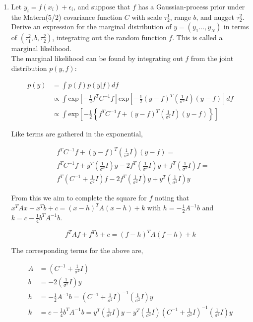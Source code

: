 \documentclass[10pt]{article}
\begin{document}
\begin{enumerate}[label=(\Alph*)]
            \clearpage

            \item Let $y_i = f(x_i) + \epsilon_i$, and suppose that $f$ has a Gaussian-process prior under the Matern(5/2) covariance function $C$ with scale $\tau^1_2$, range $b$, and nugget $\tau^2_2$.  Derive an expression for the marginal distribution of $y = (y_1 \ldots, y_N)$ in terms of $(\tau^2_1, b, \tau^2_2)$, integrating out the random function $f$.  This is called a marginal likelihood.\\

            The marginal likelihood can be found by integrating out $f$ from the joint distribution $p(y,f)$:

            \begin{align*}
                p(y) &= \int p(f) p(y|f) df \\
                & \propto \int \text{exp}\left[- \frac{1}{2} f^T C^{-1} f \right] \text{exp} \left[- \frac{1}{2} (y-f)^T \left(\frac{1}{\sigma^2} I \right) (y-f)\right] df\\
                & \propto \int \text{exp}\left[-\frac{1}{2} \left\{ f^T C^{-1}f + (y-f)^T \left(\frac{1}{\sigma^2} I \right) (y-f)\right\} \right]
            \end{align*}

            Like terms are gathered in the exponential,

            \begin{align*}
                & f^T C^{-1}f + (y-f)^T \left(\frac{1}{\sigma^2} I \right) (y-f) = \\
                & f^T C^{-1}f + y^T \left(\frac{1}{\sigma^2} I \right) y - 2 f^T \left(\frac{1}{\sigma^2} I \right) y + f^T \left(\frac{1}{\sigma^2} I \right) f = \\
                & f^T \left(C^{-1} + \frac{1}{\sigma^2} I \right) f - 2 f^T \left(\frac{1}{\sigma^2} I \right) y + y^T \left(\frac{1}{\sigma^2} I \right) y
            \end{align*}

            From this we aim to complete the square for $f$ noting that $x^T A x + x^T b + c = (x-h)^T A (x-h) + k$ with $h = -\frac{1}{2} A^{-1} b$ and $k=c - \frac{1}{4} b^T A^{-1} b$.

            $$f^T A f + f^T b + c = (f - h)^T A (f-h) + k$$

            The corresponding terms for the above are,

            \begin{align*}
                A &= \left(C^{-1} + \frac{1}{\sigma^2} I \right) \\
                b &= -2 \left(\frac{1}{\sigma^2} I \right) y\\
                h &= -\frac{1}{2}A^{-1}b = \left(C^{-1} + \frac{1}{\sigma^2} I \right)^{-1} \left(\frac{1}{\sigma^2} I \right) y \\
                k &= c - \frac{1}{4} b^T A^{-1} b = y^T \left(\frac{1}{\sigma^2} I \right) y - y^T \left(\frac{1}{\sigma^2} I \right) \left(C^{-1} + \frac{1}{\sigma^2} I \right)^{-1} \left(\frac{1}{\sigma^2} I \right) y
            \end{align*}


\end{enumerate}
\end{document}
